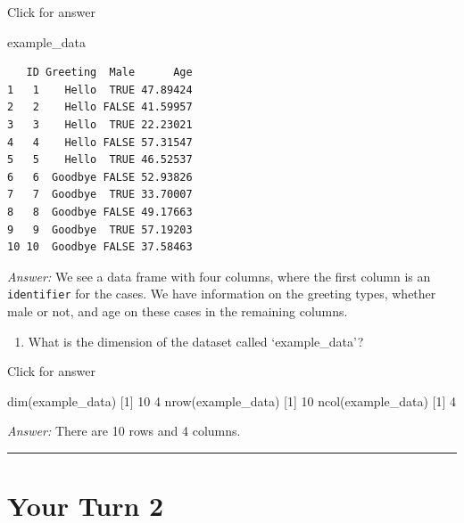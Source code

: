 \documentclass[
]{book}
\newenvironment{Shaded}{\begin{snugshade}}{\end{snugshade}}
\newcommand{\DecValTok}[1]{\textcolor[rgb]{0.00,0.00,0.81}{#1}}
\newcommand{\FunctionTok}[1]{\textcolor[rgb]{0.00,0.00,0.00}{#1}}
\newcommand{\NormalTok}[1]{#1}
\providecommand{\tightlist}{%
  \setlength{\itemsep}{0pt}\setlength{\parskip}{0pt}}
\begin{document}
Click for answer

\begin{Shaded}
\begin{Highlighting}[]
\NormalTok{example\_data}
\end{Highlighting}
\end{Shaded}

\begin{verbatim}
   ID Greeting  Male      Age
1   1    Hello  TRUE 47.89424
2   2    Hello FALSE 41.59957
3   3    Hello  TRUE 22.23021
4   4    Hello FALSE 57.31547
5   5    Hello  TRUE 46.52537
6   6  Goodbye FALSE 52.93826
7   7  Goodbye  TRUE 33.70007
8   8  Goodbye FALSE 49.17663
9   9  Goodbye  TRUE 57.19203
10 10  Goodbye FALSE 37.58463
\end{verbatim}

\emph{Answer:} We see a data frame with four columns, where the first column is an \texttt{identifier} for the cases. We have information on the greeting types, whether male or not, and age on these cases in the remaining columns.

\begin{enumerate}
\def\labelenumi{\alph{enumi}.}
\setcounter{enumi}{1}
\tightlist
\item
  What is the dimension of the dataset called `example\_data'?
\end{enumerate}

Click for answer

\begin{Shaded}
\begin{Highlighting}[]
\FunctionTok{dim}\NormalTok{(example\_data)}
\NormalTok{[}\DecValTok{1}\NormalTok{] }\DecValTok{10}  \DecValTok{4}
\FunctionTok{nrow}\NormalTok{(example\_data)}
\NormalTok{[}\DecValTok{1}\NormalTok{] }\DecValTok{10}
\FunctionTok{ncol}\NormalTok{(example\_data)}
\NormalTok{[}\DecValTok{1}\NormalTok{] }\DecValTok{4}
\end{Highlighting}
\end{Shaded}

\emph{Answer:} There are 10 rows and 4 columns.

\begin{center}\rule{0.5\linewidth}{0.5pt}\end{center}

\hypertarget{your-turn-2}{%
\section{Your Turn 2}\label{your-turn-2}}
\end{document}
